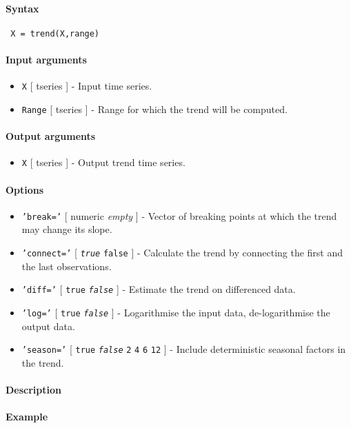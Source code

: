 


	\paragraph{Syntax}
 
 \begin{verbatim}
 X = trend(X,range)
 \end{verbatim}
 
 \paragraph{Input arguments}
 
 \begin{itemize}
 \item
   \texttt{X} {[} tseries {]} - Input time series.
 \item
   \texttt{Range} {[} tseries {]} - Range for which the trend will be
   computed.
 \end{itemize}
 
 \paragraph{Output arguments}
 
 \begin{itemize}
 \item
   \texttt{X} {[} tseries {]} - Output trend time series.
 \end{itemize}
 
 \paragraph{Options}
 
 \begin{itemize}
 \item
   \texttt{'break='} {[} numeric \textbar{} \emph{empty} {]} - Vector of
   breaking points at which the trend may change its slope.
 \item
   \texttt{'connect='} {[} \emph{\texttt{true}} \textbar{} \texttt{false}
   {]} - Calculate the trend by connecting the first and the last
   observations.
 \item
   \texttt{'diff='} {[} \texttt{true} \textbar{} \emph{\texttt{false}}
   {]} - Estimate the trend on differenced data.
 \item
   \texttt{'log='} {[} \texttt{true} \textbar{} \emph{\texttt{false}} {]}
   - Logarithmise the input data, de-logarithmise the output data.
 \item
   \texttt{'season='} {[} \texttt{true} \textbar{} \emph{\texttt{false}}
   \textbar{} \texttt{2} \textbar{} \texttt{4} \textbar{} \texttt{6}
   \textbar{} \texttt{12} {]} - Include deterministic seasonal factors in
   the trend.
 \end{itemize}
 
 \paragraph{Description}
 
 \paragraph{Example}


